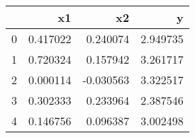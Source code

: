 \begin{tabular}{lrrr}
\toprule
{} &        x1 &        x2 &         y \\
\midrule
0 &  0.417022 &  0.240074 &  2.949735 \\
1 &  0.720324 &  0.157942 &  3.261717 \\
2 &  0.000114 & -0.030563 &  3.322517 \\
3 &  0.302333 &  0.233964 &  2.387546 \\
4 &  0.146756 &  0.096387 &  3.002498 \\
\bottomrule
\end{tabular}
